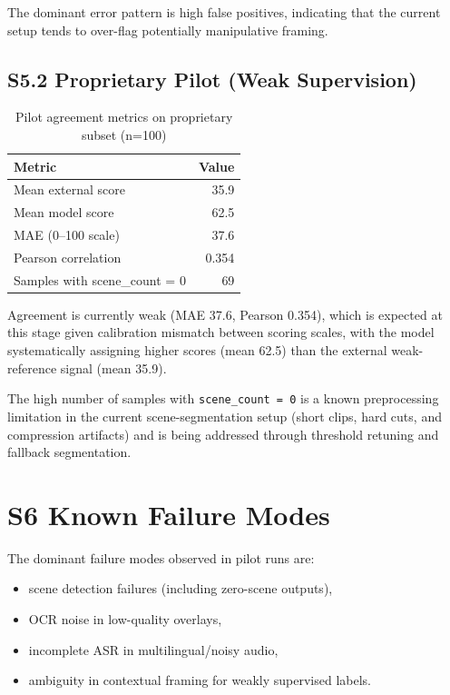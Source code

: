 \documentclass[runningheads]{llncs}
\begin{document}
The dominant error pattern is high false positives, indicating that the current setup tends to over-flag potentially manipulative framing.

\subsection*{S5.2 Proprietary Pilot (Weak Supervision)}

\begin{table}[h]
\centering
\caption{Pilot agreement metrics on proprietary subset (n=100)}
\label{tab:prop}
\footnotesize
\begin{tabular}{lr}
\toprule
\textbf{Metric} & \textbf{Value} \\
\midrule
Mean external score & 35.9 \\
Mean model score & 62.5 \\
MAE (0--100 scale) & 37.6 \\
Pearson correlation & 0.354 \\
Samples with scene\_count = 0 & 69 \\
\bottomrule
\end{tabular}
\end{table}

Agreement is currently weak (MAE 37.6, Pearson 0.354), which is expected at this stage given calibration mismatch between scoring scales, with the model systematically assigning higher scores (mean 62.5) than the external weak-reference signal (mean 35.9).

The high number of samples with \texttt{scene\_count = 0} is a known preprocessing limitation in the current scene-segmentation setup (short clips, hard cuts, and compression artifacts) and is being addressed through threshold retuning and fallback segmentation.

\section*{S6 Known Failure Modes}

The dominant failure modes observed in pilot runs are:
\begin{itemize}
\item scene detection failures (including zero-scene outputs),
\item OCR noise in low-quality overlays,
\item incomplete ASR in multilingual/noisy audio,
\item ambiguity in contextual framing for weakly supervised labels.
\end{itemize}
\end{document}
